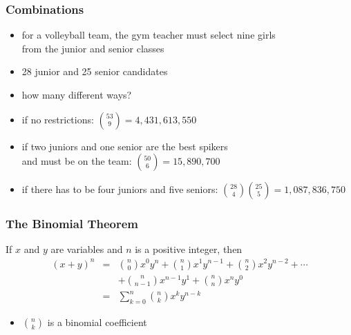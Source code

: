 \documentclass[dvipsnames]{beamer}
\begin{document}
\begin{frame}
  \frametitle{Combinations}

  \begin{example}
    \begin{itemize}
      \item for a volleyball team, the gym teacher must select nine girls\\
        from the junior and senior classes
      \item 28 junior and 25 senior candidates
      \item how many different ways?

      \pause
      \medskip
      \item if no restrictions: ${53 \choose 9} = 4,431,613,550$
      \pause
      \item if two juniors and one senior are the best spikers\\
        and must be on the team: ${50 \choose 6} = 15,890,700$
      \pause
      \item if there has to be four juniors and five seniors:
        ${28 \choose 4}{25 \choose 5} = 1,087,836,750$
    \end{itemize}
  \end{example}
\end{frame}

\begin{frame}
  \frametitle{The Binomial Theorem}

  \begin{theorem}
    If $x$ and $y$ are variables and $n$ is a positive integer, then
    \begin{eqnarray*}
      (x+y)^n & = & {n\choose 0} x^0 y^n
                    + {n\choose 1} x^1 y^{n-1}
                    + {n\choose 2} x^2 y^{n-2} + \cdots\\
              &   & + {n\choose n-1} x^{n-1} y^1
                    + {n\choose n} x^n y^0 \\
              & = & \sum^n_{k=0}{{n\choose k} x^k y^{n-k}}
    \end{eqnarray*}
  \end{theorem}

  \pause
  \begin{itemize}
    \item ${n\choose k}$ is a \alert{binomial coefficient}
  \end{itemize}
\end{frame}
\end{document}
